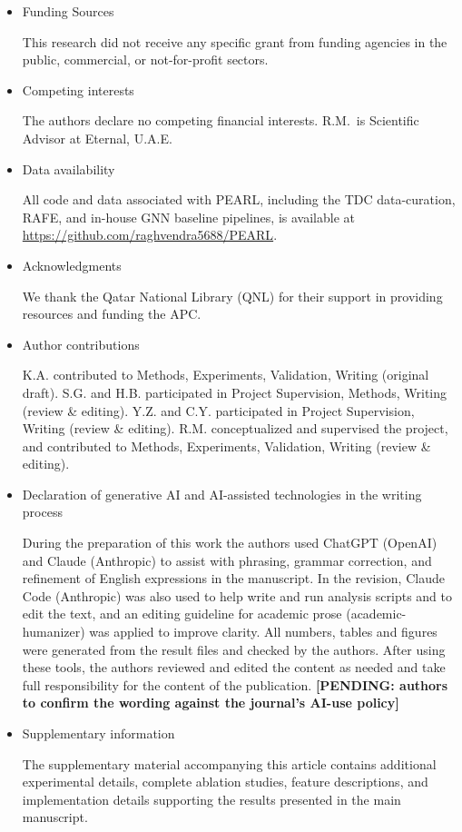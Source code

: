 \documentclass[pdflatex,sn-mathphys-num]{sn-jnl}%
\newcommand{\pending}[1]{{\color{red}\textbf{[PENDING: #1]}}}%
\begin{document}
\begin{itemize}
\item Funding Sources

This research did not receive any specific grant from funding agencies in the public, commercial, or not-for-profit sectors.

\item Competing interests

The authors declare no competing financial interests. R.M.\ is Scientific Advisor at Eternal, U.A.E.

\item Data availability

All code and data associated with PEARL, including the TDC data-curation, RAFE, and in-house GNN baseline pipelines, is available at \url{https://github.com/raghvendra5688/PEARL}.

\item Acknowledgments

We thank the Qatar National Library (QNL) for their support in providing resources and funding the APC.

\item Author contributions

K.A. contributed to Methods, Experiments, Validation, Writing (original draft). S.G. and H.B. participated in Project Supervision, Methods, Writing (review \& editing). Y.Z. and C.Y. participated in Project Supervision, Writing (review \& editing). R.M. conceptualized and supervised the project, and contributed to Methods, Experiments, Validation, Writing (review \& editing).

\item{Declaration of generative AI and AI-assisted technologies in the writing process}

During the preparation of this work the authors used ChatGPT (OpenAI) and Claude (Anthropic) to assist with phrasing, grammar correction, and refinement of English expressions in the manuscript. In the revision, Claude Code (Anthropic) was also used to help write and run analysis scripts and to edit the text, and an editing guideline for academic prose (academic-humanizer) was applied to improve clarity. All numbers, tables and figures were generated from the result files and checked by the authors. After using these tools, the authors reviewed and edited the content as needed and take full responsibility for the content of the publication. \pending{authors to confirm the wording against the journal's AI-use policy}

\item{Supplementary information}

The supplementary material accompanying this article contains additional experimental details, complete ablation studies, feature descriptions, and implementation details supporting the results presented in the main manuscript.

\end{itemize}
\end{document}
